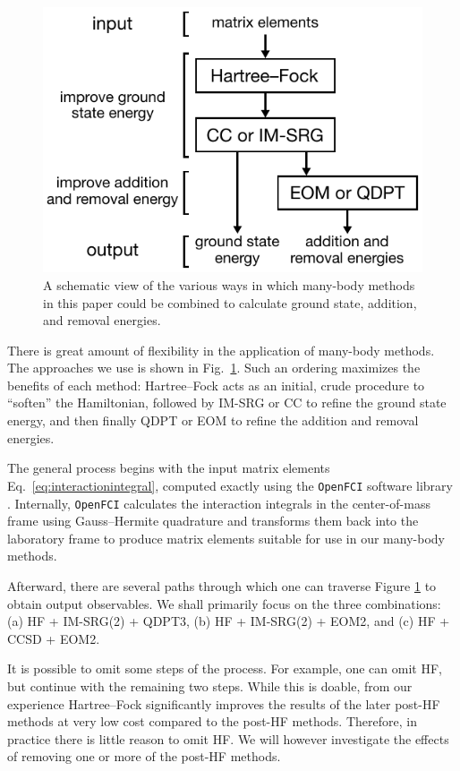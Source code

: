 \begin{figure}
  \centering
  \includegraphics{figures/fig-methods.pdf}
  \caption{A schematic view of the various ways in which many-body methods in this paper could be combined to calculate ground state, addition, and removal energies.}
  \label{fig:methods}
\end{figure}

There is great amount of flexibility in the application of many-body methods.  The approaches we use is shown in Fig.\ \ref{fig:methods}.  Such an ordering maximizes the benefits of each method: Hartree--Fock acts as an initial, crude procedure to ``soften'' the Hamiltonian, followed by IM-SRG or CC to refine the ground state energy, and then finally QDPT or EOM to refine the addition and removal energies.

The general process begins with the input matrix elements Eq.\ \eqref{eq:interactionintegral}, computed exactly using the \texttt{OpenFCI} software library \cite{2008arXiv0810.2644K}.  Internally, \texttt{OpenFCI} calculates the interaction integrals in the center-of-mass frame using Gauss--Hermite quadrature and transforms them back into the laboratory frame to produce matrix elements suitable for use in our many-body methods.

Afterward, there are several paths through which one can traverse Figure \ref{fig:methods} to obtain output observables.  We shall primarily focus on the three combinations: (a) HF + IM-SRG(2) + QDPT3, (b) HF + IM-SRG(2) + EOM2, and (c) HF + CCSD + EOM2.

It is possible to omit some steps of the process.  For example, one can omit HF, but continue with the remaining two steps.  While this is doable, from our experience Hartree--Fock significantly improves the results of the later post-HF methods at very low cost compared to the post-HF methods.  Therefore, in practice there is little reason to omit HF.  We will however investigate the effects of removing one or more of the post-HF methods.

